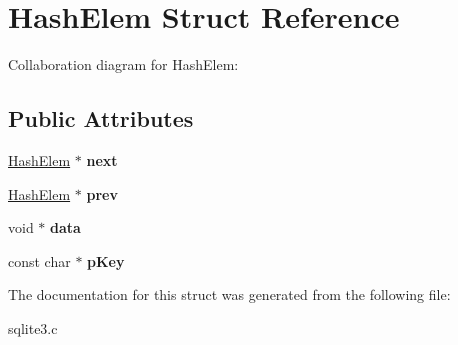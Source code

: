 \hypertarget{structHashElem}{}\section{Hash\+Elem Struct Reference}
\label{structHashElem}


Collaboration diagram for Hash\+Elem\+:
\subsection*{Public Attributes}
\begin{DoxyCompactItemize}
\item 
\hyperlink{structHashElem}{Hash\+Elem} $\ast$ {\bfseries next}\hypertarget{structHashElem_a2d28fad45ff21ffb8a02a7133df860fd}{}\label{structHashElem_a2d28fad45ff21ffb8a02a7133df860fd}

\item 
\hyperlink{structHashElem}{Hash\+Elem} $\ast$ {\bfseries prev}\hypertarget{structHashElem_ae4d011c0dc807a3c100ccdb927dd0ba9}{}\label{structHashElem_ae4d011c0dc807a3c100ccdb927dd0ba9}

\item 
void $\ast$ {\bfseries data}\hypertarget{structHashElem_ac7e80f63ba2f82457ff68aa0cd360365}{}\label{structHashElem_ac7e80f63ba2f82457ff68aa0cd360365}

\item 
const char $\ast$ {\bfseries p\+Key}\hypertarget{structHashElem_a9c33a7c8ac467a5547a123338daf61f4}{}\label{structHashElem_a9c33a7c8ac467a5547a123338daf61f4}

\end{DoxyCompactItemize}


The documentation for this struct was generated from the following file\+:\begin{DoxyCompactItemize}
\item 
sqlite3.\+c\end{DoxyCompactItemize}
